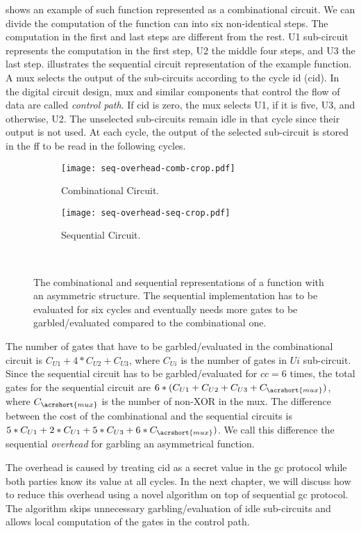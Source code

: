  shows an example of such function represented as a combinational circuit.
We can divide the computation of the function can into six non-identical steps.
The computation in the first and last steps are different from the rest.
U1 sub-circuit represents the computation in the first step, U2 the middle four steps, and U3 the last step.
 illustrates the sequential circuit representation of the example function.
A \acrshort{mux} selects the output of the sub-circuits according to the cycle id (cid).
In the digital circuit design, \acrshort{mux} and similar components that control the flow of data are called \textit{control path}.
If cid is zero, the \acrshort{mux} selects U1, if it is five, U3, and otherwise, U2.
The unselected sub-circuits remain idle in that cycle since their output is not used.
At each cycle, the output of the selected sub-circuit is stored in the \acrshort{ff} to be read in the following cycles.

\begin{figure}
    \centering
    \begin{subfigure}[t]{0.7\textwidth}
        \texttt{[image: seq-overhead-comb-crop.pdf]}
        \caption{Combinational Circuit.}\label{fig:seq-overhead-comb}
    \end{subfigure}
    \begin{subfigure}[t]{0.6\textwidth}
        \texttt{[image: seq-overhead-seq-crop.pdf]}
        \caption{Sequential Circuit.}\label{fig:seq-overhead-seq}
    \end{subfigure}\\
    \caption{The combinational and sequential representations of a function with an asymmetric structure.
    The sequential implementation has to be evaluated for six cycles and eventually needs more gates to be garbled/evaluated compared to the combinational one.}\label{fig:fig:seq-overhead-comb}
\end{figure}

The number of gates that have to be garbled/evaluated in the combinational circuit is $C_{U1}+4*C_{U2}+C_{U3}$, where $C_{Ui}$ is the number of gates in $Ui$ sub-circuit.
Since the sequential circuit has to be garbled/evaluated for $cc=6$ times, the total gates for the sequential circuit are $6*(C_{U1}+C_{U2}+C_{U3}+C_{\acrshort{mux}})$, where $C_{\acrshort{mux}}$ is the number of non-XOR in the \acrshort{mux}.
The difference between the cost of the combinational and the sequential circuits is $5*C_{U1}+2*C_{U1}+5*C_{U3}+6*C_{\acrshort{mux}})$.
We call this difference the sequential \textit{overhead} for garbling an asymmetrical function.

The overhead is caused by treating cid as a secret value in the \acrshort{gc} protocol while both parties know its value at all cycles.
In the next chapter, we will discuss how to reduce this overhead using a novel algorithm on top of sequential \acrshort{gc} protocol.
The algorithm skips unnecessary garbling/evaluation of idle sub-circuits and allows local computation of the gates in the control path.
